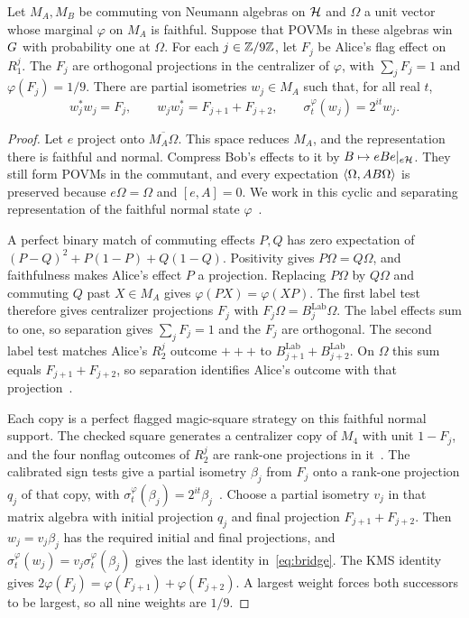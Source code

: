 \begin{lemma}
\label{lem:linked-bridge}
Let $M_A,M_B$ be commuting von Neumann algebras on $\mathcal{H}$ and $\Omega$ a unit vector
whose marginal $\varphi$ on $M_A$ is faithful. Suppose that POVMs in these algebras
win $G$ with probability one at $\Omega$. For each $j\in\mathbb{Z}/9\mathbb{Z}$, let $F_j$ be
Alice's flag effect on $R_1^j$. The $F_j$ are orthogonal projections in the centralizer
of $\varphi$, with $\sum_jF_j=1$ and $\varphi(F_j)=1/9$. There are partial isometries
$w_j\in M_A$ such that, for all real $t$,
\begin{equation}\label{eq:bridge}
w_j^*w_j=F_j,\qquad w_jw_j^*=F_{j+1}+F_{j+2},\qquad \sigma^\varphi_t(w_j)=2^{it}w_j .
\end{equation}
\end{lemma}

\begin{proof}
Let $e$ project onto $\overline{M_A\Omega}$. This space reduces $M_A$, and the
representation there is faithful and normal. Compress Bob's effects to it by
$B\mapsto eBe|_{e\mathcal{H}}$. They still form POVMs in the commutant, and every expectation
$\langle \Omega,AB\Omega\rangle$ is preserved because $e\Omega=\Omega$ and $[e,A]=0$.
We work in this cyclic and separating representation of the faithful normal state
$\varphi$~\cite[Lemma~1.6]{TG}.

A perfect binary match of commuting effects $P,Q$ has zero expectation of
$(P-Q)^2+P(1-P)+Q(1-Q)$. Positivity gives $P\Omega=Q\Omega$, and faithfulness
makes Alice's effect $P$ a projection. Replacing $P\Omega$ by $Q\Omega$ and commuting
$Q$ past $X\in M_A$ gives $\varphi(PX)=\varphi(XP)$. The first label test therefore
gives centralizer projections $F_j$ with $F_j\Omega=B_j^{\mathrm{Lab}}\Omega$.
The label effects sum to one, so separation gives $\sum_jF_j=1$ and the $F_j$ are
orthogonal. The second label test matches Alice's $R_2^j$ outcome $+++$ to
$B_{j+1}^{\mathrm{Lab}}+B_{j+2}^{\mathrm{Lab}}$. On $\Omega$ this sum equals
$F_{j+1}+F_{j+2}$, so separation identifies Alice's outcome with that
projection~\cite[Section~2.4]{TG}.

Each copy is a perfect flagged magic-square strategy on this faithful normal support.
The checked square generates a centralizer copy of $M_4$ with unit $1-F_j$, and the four
nonflag outcomes of $R_2^j$ are rank-one projections in it~\cite[Lemma~2.1]{TG}.
The calibrated sign tests give a partial isometry $\beta_j$ from $F_j$ onto a rank-one
projection $q_j$ of that copy, with $\sigma_t^\varphi(\beta_j)=2^{it}\beta_j$~\cite[Lemma~2.2]{TG}.
Choose a partial isometry $v_j$ in that matrix algebra with initial projection $q_j$
and final projection $F_{j+1}+F_{j+2}$. Then $w_j=v_j\beta_j$ has the required initial
and final projections, and $\sigma_t^\varphi(w_j)=v_j\sigma_t^\varphi(\beta_j)$ gives the
last identity in~\eqref{eq:bridge}. The KMS identity gives
$2\varphi(F_j)=\varphi(F_{j+1})+\varphi(F_{j+2})$.
A largest weight forces both successors to be largest, so all nine weights are $1/9$.
\end{proof}

